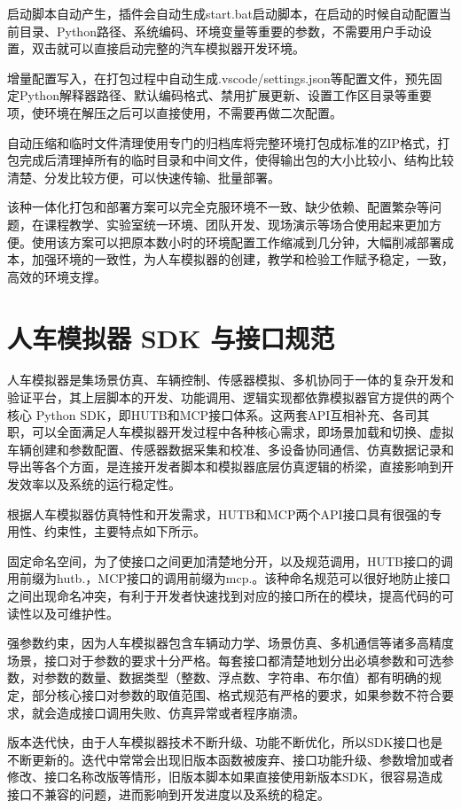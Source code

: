 启动脚本自动产生，插件会自动生成start.bat启动脚本，在启动的时候自动配置当前目录、Python路径、系统编码、环境变量等重要的参数，不需要用户手动设置，双击就可以直接启动完整的汽车模拟器开发环境。

增量配置写入，在打包过程中自动生成.vscode/settings.json等配置文件，预先固定Python解释器路径、默认编码格式、禁用扩展更新、设置工作区目录等重要项，使环境在解压之后可以直接使用，不需要再做二次配置。

自动压缩和临时文件清理使用专门的归档库将完整环境打包成标准的ZIP格式，打包完成后清理掉所有的临时目录和中间文件，使得输出包的大小比较小、结构比较清楚、分发比较方便，可以快速传输、批量部署。

该种一体化打包和部署方案可以完全克服环境不一致、缺少依赖、配置繁杂等问题，在课程教学、实验室统一环境、团队开发、现场演示等场合使用起来更加方便。使用该方案可以把原本数小时的环境配置工作缩减到几分钟，大幅削减部署成本，加强环境的一致性，为人车模拟器的创建，教学和检验工作赋予稳定，一致，高效的环境支撑。

\section{人车模拟器 SDK 与接口规范}

人车模拟器是集场景仿真、车辆控制、传感器模拟、多机协同于一体的复杂开发和验证平台，其上层脚本的开发、功能调用、逻辑实现都依靠模拟器官方提供的两个核心
Python
SDK，即HUTB和MCP接口体系。这两套API互相补充、各司其职，可以全面满足人车模拟器开发过程中各种核心需求，即场景加载和切换、虚拟车辆创建和参数配置、传感器数据采集和校准、多设备协同通信、仿真数据记录和导出等各个方面，是连接开发者脚本和模拟器底层仿真逻辑的桥梁，直接影响到开发效率以及系统的运行稳定性。

根据人车模拟器仿真特性和开发需求，HUTB和MCP两个API接口具有很强的专用性、约束性，主要特点如下所示。

固定命名空间，为了使接口之间更加清楚地分开，以及规范调用，HUTB接口的调用前缀为hutb.，MCP接口的调用前缀为mcp.。该种命名规范可以很好地防止接口之间出现命名冲突，有利于开发者快速找到对应的接口所在的模块，提高代码的可读性以及可维护性。

强参数约束，因为人车模拟器包含车辆动力学、场景仿真、多机通信等诸多高精度场景，接口对于参数的要求十分严格。每套接口都清楚地划分出必填参数和可选参数，对参数的数量、数据类型（整数、浮点数、字符串、布尔值）都有明确的规定，部分核心接口对参数的取值范围、格式规范有严格的要求，如果参数不符合要求，就会造成接口调用失败、仿真异常或者程序崩溃。

版本迭代快，由于人车模拟器技术不断升级、功能不断优化，所以SDK接口也是不断更新的。迭代中常常会出现旧版本函数被废弃、接口功能升级、参数增加或者修改、接口名称改版等情形，旧版本脚本如果直接使用新版本SDK，很容易造成接口不兼容的问题，进而影响到开发进度以及系统的稳定。

